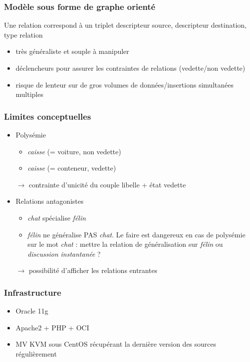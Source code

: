 \documentclass{beamer}
\begin{document}
\begin{frame}
\frametitle{Modèle sous forme de graphe orienté}
Une relation correspond à un triplet descripteur source, descripteur destination, type relation
\begin{itemize}
\item très généraliste et souple à manipuler
\item déclencheurs pour assurer les contraintes de relations (vedette/non vedette)
\item risque de lenteur sur de gros volumes de données/insertions simultanées multiples
\end{itemize}
\end{frame}


\begin{frame}
\frametitle{Limites conceptuelles}
\begin{itemize}
\item Polysémie
\begin{itemize}
\item \emph{caisse} (= voiture, non vedette)
\item \emph{caisse} (= conteneur, vedette)
\end{itemize}
$\rightarrow$ contrainte d'unicité du couple libelle + état vedette

\item Relations antagonistes
\begin{itemize}
\item \emph{chat} spécialise \emph{félin}
\item \emph{félin} ne généralise PAS \emph{chat}. Le faire est dangereux en cas de polysémie sur le mot \emph{chat} : mettre la relation de généralisation sur \emph{félin} ou \emph{discussion instantanée} ?
\end{itemize}
$\rightarrow$ possibilité d'afficher les relations entrantes
\end{itemize}
\end{frame}


\begin{frame}
\frametitle{Infrastructure}
\begin{itemize}
\item Oracle 11g
\item Apache2 + PHP + OCI
\item MV KVM sous CentOS récupérant la dernière version des sources régulièrement
\end{itemize}
\end{frame}
\end{document}
